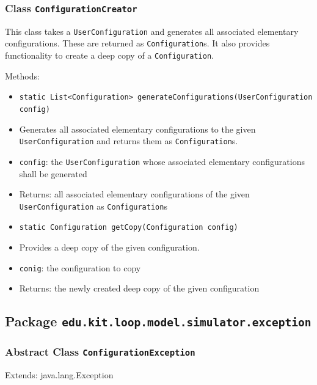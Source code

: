 \documentclass[parskip=full,11pt]{scrartcl}
\begin{document}
\subsubsection{Class \texttt{ConfigurationCreator}}
This class takes a \texttt{UserConfiguration} and generates all associated elementary configurations. These are returned as \texttt{Configuration}s. It also provides functionality to create a deep copy of a \texttt{Configuration}.

Methods:
\begin{itemize}\itemsep -10pt
\item \texttt{static List<Configuration> generateConfigurations(UserConfiguration config)}
\item[] Generates all associated elementary configurations to the given \texttt{UserConfiguration} and returns them as \texttt{Configuration}s.
\item[] \texttt{config}: the \texttt{UserConfiguration} whose associated elementary configurations shall be generated
\item[] Returns: all associated elementary configurations of the given \texttt{UserConfiguration} as \texttt{Configuration}s

\item \texttt{static Configuration getCopy(Configuration config)}
\item[] Provides a deep copy of the given configuration.
\item[] \texttt{conig}: the configuration to copy
\item[] Returns: the newly created deep copy of the given configuration
\end{itemize}

\subsection{Package \texttt{edu.kit.loop.model.simulator.exception}}

\subsubsection{Abstract Class \texttt{ConfigurationException }}
Extends: java.lang.Exception
\end{document}
